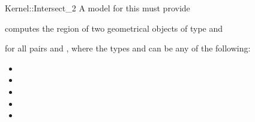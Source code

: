 \begin{ccRefFunctionObjectConcept}{Kernel::Intersect_2}
A model for this must provide


{computes the  region of two geometrical objects of type 
 and }

for all pairs  and , where
the types  and  can be any of the
following:
\begin{itemize}
\item {}
\item {}
\item {}
\item {}
\item {}
\end{itemize}

\end{ccRefFunctionObjectConcept}
